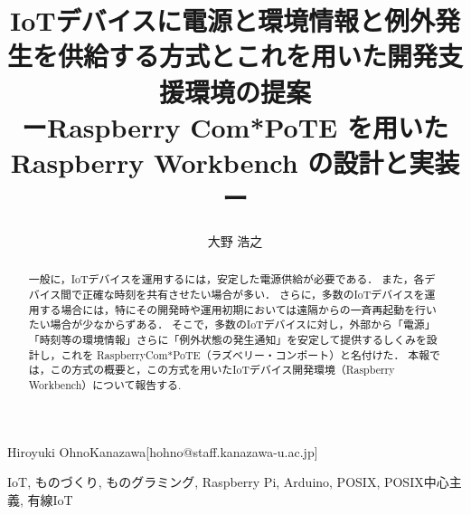 \title{
  IoTデバイスに電源と環境情報と例外発生を供給する方式とこれを用いた開発支援環境の提案\\
  ーRaspberry Com*PoTE を用いた Raspberry Workbench の設計と実装ー
}



\author{大野 浩之}{Hiroyuki Ohno}{Kanazawa}[hohno@staff.kanazawa-u.ac.jp]


\begin{abstract}
 一般に，IoTデバイスを運用するには，安定した電源供給が必要である．
 また，各デバイス間で正確な時刻を共有させたい場合が多い．
 さらに，多数のIoTデバイスを運用する場合には，特にその開発時や運用初期においては遠隔からの一斉再起動を行いたい場合が少なからずある．
 そこで，多数のIoTデバイスに対し，外部から「電源」「時刻等の環境情報」さらに「例外状態の発生通知」を安定して提供するしくみを設計し，これを RaspberryCom*PoTE（ラズベリー・コンポート）と名付けた．
 本報では，この方式の概要と，この方式を用いたIoTデバイス開発環境（Raspberry Workbench）について報告する.



\end{abstract}

\begin{jkeyword}
IoT, ものづくり, ものグラミング, Raspberry Pi, Arduino, POSIX, POSIX中心主義, 有線IoT
\end{jkeyword}


